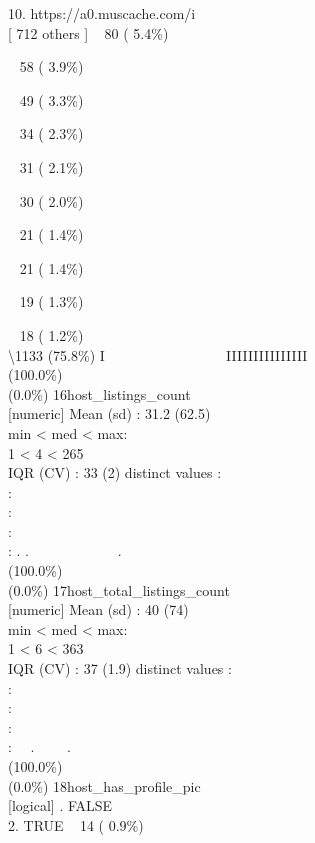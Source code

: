 \documentclass[
  journal,
]{IEEEtran}%
\begin{document}
10. https://a0.muscache.com/i\\
{[} 712 others {]} \textbar~ 80 ( 5.4\%)\\
\strut ~ 58 ( 3.9\%)\\
\strut ~ 49 ( 3.3\%)\\
\strut ~ 34 ( 2.3\%)\\
\strut ~ 31 ( 2.1\%)\\
\strut ~ 30 ( 2.0\%)\\
\strut ~ 21 ( 1.4\%)\\
\strut ~ 21 ( 1.4\%)\\
\strut ~ 19 ( 1.3\%)\\
\strut ~ 18 ( 1.2\%)\\
\textbackslash1133 (75.8\%) \textbar{} \textbar I ~ ~ ~ ~ ~ ~ ~ ~ ~ ~
IIIIIIIIIIIIIII \\
(100.0\%) \\
(0.0\%) \textbar{} \textbar{} 16\textbar host\_listings\_count\\
{[}numeric{]} \textbar Mean (sd) : 31.2 (62.5)\\
min \textless{} med \textless{} max:\\
1 \textless{} 4 \textless{} 265\\
IQR (CV) : 33 (2)  distinct values \textbar{} \textbar:\\
:\\
:\\
:\\
: . . ~~~~~~~~~~~~. \\
(100.0\%) \\
(0.0\%) \textbar{} \textbar{} 17\textbar host\_total\_listings\_count\\
{[}numeric{]} \textbar Mean (sd) : 40 (74)\\
min \textless{} med \textless{} max:\\
1 \textless{} 6 \textless{} 363\\
IQR (CV) : 37 (1.9)  distinct values \textbar{} \textbar:\\
:\\
:\\
:\\
: ~~. ~~~~. \\
(100.0\%) \\
(0.0\%) \textbar{} \textbar{} 18\textbar host\_has\_profile\_pic\\
{[}logical{]} . FALSE\\
2. TRUE \textbar~ 14 ( 0.9\%)\\
\end{document}
